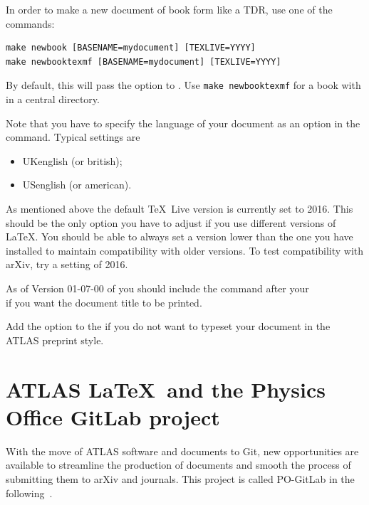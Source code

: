 In order to make a new document of book form like a TDR, use one of the commands:
%
\begin{verbatim}
make newbook [BASENAME=mydocument] [TEXLIVE=YYYY]
make newbooktexmf [BASENAME=mydocument] [TEXLIVE=YYYY]
\end{verbatim}
%
By default, this will pass the option  to .
Use \verb|make newbooktexmf| for a book with  in a central directory.

Note that you have to specify the language of your document as an option in the
 command. Typical settings are
\begin{itemize}
\item UKenglish (or british);
\item USenglish (or american).
\end{itemize}

As mentioned above the default \TeX\ Live version is currently set to 2016.
This should be the only option you have to adjust if you use different versions of \LaTeX.
You should be able to always set a version lower than the one you have installed to maintain compatibility with older versions.
To test compatibility with arXiv, try a setting of 2016.

As of Version 01-07-00 of  you should include the command  after your\\
\verb|| if you want the document title to be printed.

Add the option  to the  if you do not want to typeset your document in the ATLAS preprint style.

\section{ATLAS \LaTeX\ and the Physics Office GitLab project}

With the move of ATLAS software and documents to Git,
new opportunities are available to streamline the production of documents
and smooth the process of submitting them to arXiv and journals.
This project is called PO-GitLab in the following~\cite{atlas-PO-gitlab}.

